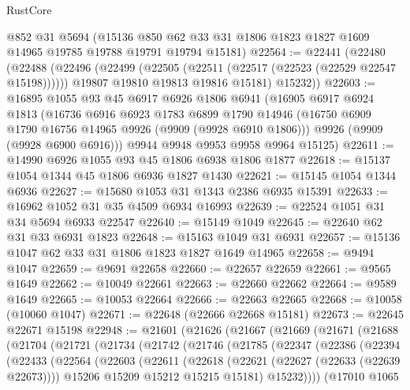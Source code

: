 \begin{lexlean}{RustCore}
\begin{coremodule}
    @852
    @31
    @5694
    (@15136 @850 @62 @33 @31 @1806 @1823 @1827 @1609 @14965 @19785 @19788 @19791 @19794 @15181)
@22564 := @22441
    (@22480
      (@22488
        (@22496
          (@22499 (@22505 (@22511 (@22517 (@22523 (@22529 @22547 @15198))))))
          @19807
          @19810
          @19813
          @19816
          @15181)
        @15232))
@22603 := @16895
    @1055
    @93
    @45
    @6917
    @6926
    @1806
    @6941
    (@16905
      @6917
      @6924
      @1813
      (@16736
        @6916
        @6923
        @1783
        @6899
        @1790
        @14946
        (@16750 @6909 @1790 @16756 @14965 @9926 (@9909 (@9928 @6910 @1806)))
        @9926
        (@9909 (@9928 @6900 @6916)))
      @9944
      @9948
      @9953
      @9958
      @9964
      @15125)
@22611 := @14990 @6926 @1055 @93 @45 @1806 @6938 @1806 @1877
@22618 := @15137 @1054 @1344 @45 @1806 @6936 @1827 @1430
@22621 := @15145 @1054 @1344 @6936
@22627 := @15680 @1053 @31 @1343 @2386 @6935 @15391
@22633 := @16962 @1052 @31 @35 @4509 @6934 @16993
@22639 := @22524 @1051 @31 @34 @5694 @6933 @22547
@22640 := @15149 @1049
@22645 := @22640 @62 @31 @33 @6931 @1823
@22648 := @15163 @1049 @31 @6931
@22657 := @15136 @1047 @62 @33 @31 @1806 @1823 @1827 @1649 @14965
@22658 := @9494 @1047
@22659 := @9691 @22658
@22660 := @22657 @22659
@22661 := @9565 @1649
@22662 := @10049 @22661
@22663 := @22660 @22662
@22664 := @9589 @1649
@22665 := @10053 @22664
@22666 := @22663 @22665
@22668 := @10058 (@10060 @1047)
@22671 := @22648 (@22666 @22668 @15181)
@22673 := @22645 @22671 @15198
@22948 := @21601
    (@21626
      (@21667
        (@21669
          (@21671
            (@21688
              (@21704
                (@21721
                  (@21734
                    (@21742
                      (@21746
                        (@21785
                          (@22347
                            (@22386
                              (@22394
                                (@22433
                                  (@22564
                                    (@22603
                                      (@22611
                                        (@22618
                                          (@22621 (@22627 (@22633 (@22639 @22673))))
                                          @15206
                                          @15209
                                          @15212
                                          @15215
                                          @15181)
                                        @15232))))
                                (@17010
                                  @1065

\end{coremodule}
\end{lexlean}
